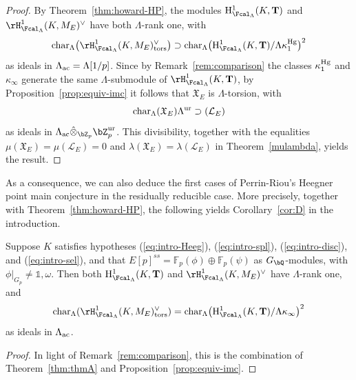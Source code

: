 \begin{proof}
By Theorem~\ref{thm:howard-HP},
the modules ${\rm H}^1_{\Fcal_\Lambda}(K,\mathbf{T})$ and
$\rH^1_{\Fcal_\Lambda}(K,M_E)^\vee$ have both $\Lambda$-rank one, with
\[
{\rm char}_\Lambda\bigl(\rH^1_{\Fcal_\Lambda}(K,M_E)^\vee_{\rm tors}\bigr)\supset{\rm char}_\Lambda\bigl({\rm H}^1_{\Fcal_\Lambda}(K,\mathbf{T})/\Lambda\kappa_1^{\rm Hg}\bigr)^2
\]
as ideals in $\Lambda_{\rm ac}=\Lambda[1/p]$. Since by Remark~\ref{rem:comparison}
the classes $\kappa_1^{\rm Hg}$ and $\kappa_\infty$ generate the same $\Lambda$-submodule of $\rH^1_{\Fcal_\Lambda}(K,\mathbf{T})$, by Proposition~\ref{prop:equiv-imc} it follows that $\mathfrak{X}_E$ is $\Lambda$-torsion, with
\[
{\rm char}_\Lambda(\mathfrak{X}_E)\Lambda^{\rm ur}\supset(\mathcal{L}_E)
\]
as ideals in $\Lambda_{\rm ac}\hat{\otimes}_{\bZ_p}\bZ_p^{\rm ur}$. This divisibility, together with the equalities $\mu(\mathfrak{X}_E)=\mu(\mathcal{L}_E)=0$ and $\lambda(\mathfrak{X}_E)=\lambda(\mathcal{L}_E)$ in Theorem~\ref{mulambda}, yields the result.
\end{proof}

As a consequence, we can also deduce the first cases of Perrin-Riou's Heegner point main conjecture \cite{perrinriou} in the residually reducible case. More precisely, together with Theorem~\ref{thm:howard-HP}, the following yields Corollary~\ref{cor:D} in the introduction.

\begin{cor}
\notready\label{cor:PR} Suppose $K$ satisfies hypotheses {\rm (\ref{eq:intro-Heeg})}, {\rm (\ref{eq:intro-spl})},  {\rm (\ref{eq:intro-disc})}, and {\rm (\ref{eq:intro-sel})}, and that
$E[p]^{ss}=\mathbb{F}_p(\phi)\oplus\mathbb{F}_p(\psi)$ as $G_\bQ$-modules, with $\phi\vert_{G_p}\neq\mathds{1},\omega$.
Then both ${\rm H}^1_{\Fcal_\Lambda}(K,\mathbf{T})$ and
$\rH^1_{\Fcal_\Lambda}(K,M_E)^\vee$ have $\Lambda$-rank one, and
\[
\mathrm{char}_\Lambda(\rH^1_{\Fcal_\Lambda}(K,M_E)^\vee_{\rm tors})=\mathrm{char}_\Lambda\bigl({\rm H}^1_{\Fcal_\Lambda}(K,\mathbf{T})/\Lambda\kappa_\infty\bigr)^2
\]
as ideals in $\Lambda_{\rm ac}$.
\end{cor}

\begin{proof}
In light of Remark~\ref{rem:comparison}, this is the combination of Theorem~\ref{thm:thmA} and Proposition~\ref{prop:equiv-imc}.
\end{proof}

